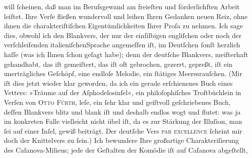 \begin{ledgroupsized}[t]{13cm}
                    will ſcheinen, daß man im Berufsgewand am freieſten und förderlichſten Arbeit
                    leiſtet. Ihre Verſe fließen wundervoll und leihen Ihren Gedanken neuen Reiz,
                    ohne ihnen die charakteriſtiſchen Eigentümlichkeiten Ihrer Proſa zu nehmen. Ich
                    sage dies, obwohl ich den Blankvers, der nur der einſilbigen engliſchen oder noch der verſchleifenden italieniſchenSprache
                    angemeſſen iſt, im Deutſchen ſonſt herzlich haſſe (was ich Ihnen ſchon geſagt
                    habe); denn der deutſche Blankvers, mei{\pb}ſterhaft gehandhabt, das iſt
                    gemeiſtert, das iſt oft gebrochen, gezerrt, gepreßt, iſt ein unerträgliches
                    Geſchöpf, eine endloſe Melodie, ein ſtätiges Meeresrauſchen. (Mir iſt dies jetzt
                    wieder klar geworden, da ich ein gerade erſchienenes Buch eines Vetters: »Träume auf der Aſphodelosinſel«, ein
                    philoſophiſches Troſtbüchlein in Verſen von \textsc{Otto Fürth}, leſe, ein ſehr klar und geiſtvoll
                    geſchriebenes Buch, deſſen Blankvers blitz und blank iſt und deshalb endlos wogt
                    und flutet: was ja im konkreten Falle vielleicht nicht übel iſt, da es zur
                    Stärkung der Illuſion, man ſei auf einer Inſel, gewiß beiträgt. Der deutſche
                    Vers \textsc{par excellence}{ }ſcheint mir doch der Knittelvers zu ſein.)\pend
           \pstart
           Ich bewundere Ihre großartige Charakteriſierung des Caſanova-Milieus; jede der Geſtalten der Komödie iſt
                    auf Caſanova abgeſtellt,

\end{ledgroupsized}
